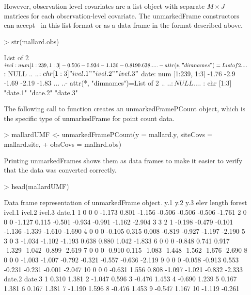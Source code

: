 \documentclass[article,shortnames]{jss}
\newcommand{\ocovs}{\code{obsCovs}}
\begin{document}
However, observation level covariates
are a list object with separate $M \times J$ matrices for each
observation-level covariate.  The unmarkedFrame constructors can
accept \ocovs\ in this list format or as a data frame in the format
described above.

\begin{Schunk}
\begin{Sinput}
> str(mallard.obs)
\end{Sinput}
\begin{Soutput}
List of 2
 $ ivel: num [1:239, 1:3] -0.506 -0.934 -1.136 -0.819 0.638 ...
  ..- attr(*, "dimnames")=List of 2
  .. ..$ : NULL
  .. ..$ : chr [1:3] "ivel.1" "ivel.2" "ivel.3"
 $ date: num [1:239, 1:3] -1.76 -2.9 -1.69 -2.19 -1.83 ...
  ..- attr(*, "dimnames")=List of 2
  .. ..$ : NULL
  .. ..$ : chr [1:3] "date.1" "date.2" "date.3"
\end{Soutput}
\end{Schunk}

The following call to  function creates an
unmarkedFramePCount object, which is the specific type of
unmarkedFrame for point count data.

\begin{Schunk}
\begin{Sinput}
> mallardUMF <- unmarkedFramePCount(y = mallard.y, siteCovs = mallard.site, 
+     obsCovs = mallard.obs)
\end{Sinput}
\end{Schunk}

Printing unmarkedFrames shows them as data frames to make it easier to
verify that the data was converted correctly.

\begin{Schunk}
\begin{Sinput}
> head(mallardUMF)
\end{Sinput}
\begin{Soutput}
Data frame representation of unmarkedFrame object.
   y.1 y.2 y.3   elev length forest ivel.1 ivel.2 ivel.3 date.1
1    0   0   0 -1.173  0.801 -1.156 -0.506 -0.506 -0.506 -1.761
2    0   0   0 -1.127  0.115 -0.501 -0.934 -0.991 -1.162 -2.904
3    3   2   1 -0.198 -0.479 -0.101 -1.136 -1.339 -1.610 -1.690
4    0   0   0 -0.105  0.315  0.008 -0.819 -0.927 -1.197 -2.190
5    3   0   3 -1.034 -1.102 -1.193  0.638  0.880  1.042 -1.833
6    0   0   0 -0.848  0.741  0.917 -1.329 -1.042 -0.899 -2.619
7    0   0   0 -0.910  0.115 -1.083 -1.448 -1.562 -1.676 -2.690
8    0   0   0 -1.003 -1.007 -0.792 -0.321 -0.557 -0.636 -2.119
9    0   0   0 -0.058 -0.913  0.553 -0.231 -0.231 -0.001 -2.047
10   0   0   0 -0.631  1.556  0.808 -1.097 -1.021 -0.832 -2.333
   date.2 date.3
1   0.310  1.381
2  -1.047  0.596
3  -0.476  1.453
4  -0.690  1.239
5   0.167  1.381
6   0.167  1.381
7  -1.190  1.596
8  -0.476  1.453
9  -0.547  1.167
10 -1.119 -0.261
\end{Soutput}
\end{Schunk}
\end{document}
